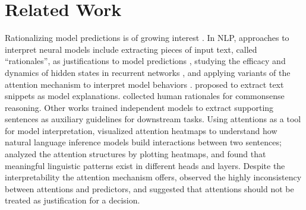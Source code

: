 \documentclass[11pt,a4paper]{article}
\begin{document}
\section{Related Work} 
\label{related-work}
Rationalizing model predictions is of growing interest \citep{ribeiro2016i,shrikumar2017learning,10.1371/journal.pone.0130140,kindermans2017learning,montavon2017explaining,schwab2019cxplain,arrieta2020explainable}.
In NLP, 
approaches to interpret neural models include 
 extracting 
pieces of input text, called ``rationales'', as justifications to model predictions  \citep{lei2016rationalizing,chang2019game,deyoung-etal-2020-eraser,jain-etal-2020-learning}, studying the 
efficacy and dynamics of hidden states in recurrent networks \citep{karpathy2015visualizing,shi-etal-2016-neural,greff2016lstm,strobelt2016visual}, and applying variants of the attention mechanism \citep{bahdanau2014neural} to interpret model behaviors \cite{jain2019attention,serrano2019attention,wiegreffe-pinter-2019-attention,vashishth2019attention,rogers2020primer}. 
\citet{lei2016rationalizing} proposed to extract text snippets as model explanations.
\citet{rajani2019explain} collected human rationales for commonsense reasoning.
Other works \citep{chen-etal-2019-seeing,lehman-etal-2019-inferring,chai2020description} trained independent models to extract supporting sentences as auxiliary guidelines for 
downstream tasks.
Using attentions as a tool for model interpretation, \citet{ghaeini2018interpreting} visualized attention heatmaps to understand how natural language inference models build interactions between two sentences;
\citet{vig2019analyzing,tenney2019bert,clark2019does,htut2019attention} analyzed the attention structures by plotting heatmaps, and found that meaningful linguistic patterns
exist in different heads and layers.
Despite the interpretability the attention mechanism offers, 
 observed the highly inconsistency between attentions and predictors, and suggested that attentions
should not be treated as justification for a decision.
\end{document}
